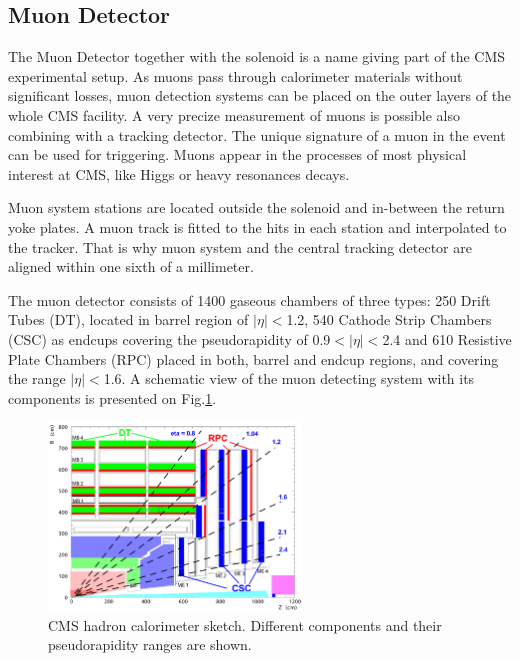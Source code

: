 \subsection{Muon Detector}

The Muon Detector\cite{CMSatLHC} together with the solenoid is a name giving part of the CMS experimental setup. As muons pass through calorimeter materials
without significant losses\cite{MuonStop}, muon detection systems can be placed on the outer layers of the whole CMS facility. A very precize measurement of muons 
is possible also combining with a tracking detector. The unique signature of a muon in the event can be used for triggering. Muons appear in the processes
of most physical interest at CMS, like Higgs or heavy resonances decays.

Muon system stations are located outside the solenoid and in-between the return yoke plates. A muon track is fitted to the hits in each station 
and interpolated to the tracker. That is why muon system and the central tracking detector are aligned within one sixth of a millimeter.

The muon detector consists of 1400 gaseous chambers of three types: 250 Drift Tubes (DT), located in barrel region of $|\eta| < $1.2, 540 Cathode Strip Chambers
(CSC) as endcups covering the pseudorapidity of 0.9$ < |\eta| < $2.4 and 610 Resistive Plate Chambers (RPC) placed in both, barrel and endcup regions, and covering
the range $|\eta| < $1.6. A schematic view of the muon detecting system with its components is presented on Fig.\ref{fig:muond}.

\begin{figure}[t]
  \centering
  \includegraphics[width=0.6\textwidth]{02_experimental_setup/plots/Figures_Experimental_Apparatus_MuonDetector.png}
  \caption{CMS hadron calorimeter sketch. Different components and their pseudorapidity ranges are shown.}
  \label{fig:muond}
\end{figure}

